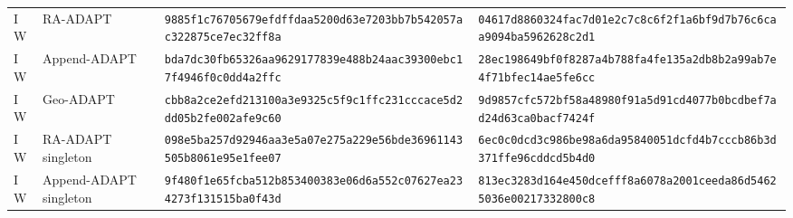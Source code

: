 \documentclass[10pt,letterpaper]{article}
\begin{document}
\begin{longtable}{@{}llp{2.55in}p{2.55in}@{}}
IW & RA-ADAPT & \texttt{9885f1c7}\allowbreak{}\texttt{6705679e}\allowbreak{}\texttt{fdffdaa5}\allowbreak{}\texttt{200d63e7}\allowbreak{}\texttt{203bb7b5}\allowbreak{}\texttt{42057ac3}\allowbreak{}\texttt{22875ce7}\allowbreak{}\texttt{ec32ff8a}\allowbreak{} & \texttt{04617d88}\allowbreak{}\texttt{60324fac}\allowbreak{}\texttt{7d01e2c7}\allowbreak{}\texttt{c8c6f2f1}\allowbreak{}\texttt{a6bf9d7b}\allowbreak{}\texttt{76c6caa9}\allowbreak{}\texttt{094ba596}\allowbreak{}\texttt{2628c2d1}\allowbreak{} \\
IW & Append-ADAPT & \texttt{bda7dc30}\allowbreak{}\texttt{fb65326a}\allowbreak{}\texttt{a9629177}\allowbreak{}\texttt{839e488b}\allowbreak{}\texttt{24aac393}\allowbreak{}\texttt{00ebc17f}\allowbreak{}\texttt{4946f0c0}\allowbreak{}\texttt{dd4a2ffc}\allowbreak{} & \texttt{28ec1986}\allowbreak{}\texttt{49bf0f82}\allowbreak{}\texttt{87a4b788}\allowbreak{}\texttt{fa4fe135}\allowbreak{}\texttt{a2db8b2a}\allowbreak{}\texttt{99ab7e4f}\allowbreak{}\texttt{71bfec14}\allowbreak{}\texttt{ae5fe6cc}\allowbreak{} \\
IW & Geo-ADAPT & \texttt{cbb8a2ce}\allowbreak{}\texttt{2efd2131}\allowbreak{}\texttt{00a3e932}\allowbreak{}\texttt{5c5f9c1f}\allowbreak{}\texttt{fc231ccc}\allowbreak{}\texttt{ace5d2dd}\allowbreak{}\texttt{05b2fe00}\allowbreak{}\texttt{2afe9c60}\allowbreak{} & \texttt{9d9857cf}\allowbreak{}\texttt{c572bf58}\allowbreak{}\texttt{a48980f9}\allowbreak{}\texttt{1a5d91cd}\allowbreak{}\texttt{4077b0bc}\allowbreak{}\texttt{dbef7ad2}\allowbreak{}\texttt{4d63ca0b}\allowbreak{}\texttt{acf7424f}\allowbreak{} \\
IW & RA-ADAPT singleton & \texttt{098e5ba2}\allowbreak{}\texttt{57d92946}\allowbreak{}\texttt{aa3e5a07}\allowbreak{}\texttt{e275a229}\allowbreak{}\texttt{e56bde36}\allowbreak{}\texttt{96114350}\allowbreak{}\texttt{5b8061e9}\allowbreak{}\texttt{5e1fee07}\allowbreak{} & \texttt{6ec0c0dc}\allowbreak{}\texttt{d3c986be}\allowbreak{}\texttt{98a6da95}\allowbreak{}\texttt{840051dc}\allowbreak{}\texttt{fd4b7ccc}\allowbreak{}\texttt{b86b3d37}\allowbreak{}\texttt{1ffe96cd}\allowbreak{}\texttt{dcd5b4d0}\allowbreak{} \\
IW & Append-ADAPT singleton & \texttt{9f480f1e}\allowbreak{}\texttt{65fcba51}\allowbreak{}\texttt{2b853400}\allowbreak{}\texttt{383e06d6}\allowbreak{}\texttt{a552c076}\allowbreak{}\texttt{27ea2342}\allowbreak{}\texttt{73f13151}\allowbreak{}\texttt{5ba0f43d}\allowbreak{} & \texttt{813ec328}\allowbreak{}\texttt{3d164e45}\allowbreak{}\texttt{0dcefff8}\allowbreak{}\texttt{a6078a20}\allowbreak{}\texttt{01ceeda8}\allowbreak{}\texttt{6d546250}\allowbreak{}\texttt{36e00217}\allowbreak{}\texttt{332800c8}\allowbreak{} \\

\end{longtable}
\end{document}
